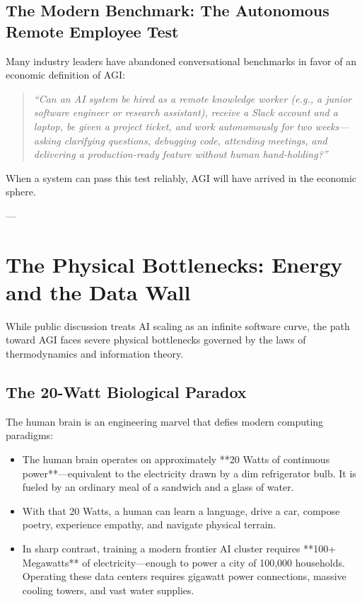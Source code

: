\documentclass[11pt,journal,onecolumn]{IEEEtran}
\begin{document}
\subsection{The Modern Benchmark: The Autonomous Remote Employee Test}
Many industry leaders have abandoned conversational benchmarks in favor of an economic definition of AGI:
\begin{quote}
\textit{``Can an AI system be hired as a remote knowledge worker (e.g., a junior software engineer or research assistant), receive a Slack account and a laptop, be given a project ticket, and work autonomously for two weeks---asking clarifying questions, debugging code, attending meetings, and delivering a production-ready feature without human hand-holding?''}
\end{quote}
When a system can pass this test reliably, AGI will have arrived in the economic sphere.

---

\section{The Physical Bottlenecks: Energy and the Data Wall}
\label{sec:bottlenecks}

While public discussion treats AI scaling as an infinite software curve, the path toward AGI faces severe physical bottlenecks governed by the laws of thermodynamics and information theory.

\subsection{The 20-Watt Biological Paradox}
The human brain is an engineering marvel that defies modern computing paradigms:
\begin{itemize}
    \item The human brain operates on approximately **20 Watts of continuous power**---equivalent to the electricity drawn by a dim refrigerator bulb. It is fueled by an ordinary meal of a sandwich and a glass of water.
    \item With that 20 Watts, a human can learn a language, drive a car, compose poetry, experience empathy, and navigate physical terrain.
    \item In sharp contrast, training a modern frontier AI cluster requires **100+ Megawatts** of electricity---enough to power a city of 100,000 households. Operating these data centers requires gigawatt power connections, massive cooling towers, and vast water supplies.
\end{itemize}
\end{document}
